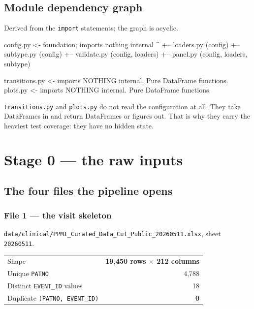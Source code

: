 \documentclass[11pt,a4paper]{article}
\newcommand{\code}[1]{\texttt{\small #1}}
\begin{document}
\subsection{Module dependency graph}

Derived from the \code{import} statements; the graph is acyclic.

\begin{codeblock}
  config.py        <- foundation; imports nothing internal
      ^
      +-- loaders.py      (config)
      +-- subtype.py      (config)
      +-- validate.py     (config, loaders)
      +-- panel.py        (config, loaders, subtype)

  transitions.py   <- imports NOTHING internal. Pure DataFrame functions.
  plots.py         <- imports NOTHING internal. Pure DataFrame functions.
\end{codeblock}

\noindent
\code{transitions.py} and \code{plots.py} do not read the configuration at all.
They take DataFrames in and return DataFrames or figures out. That is why they
carry the heaviest test coverage: they have no hidden state.

\section{Stage 0 --- the raw inputs}

\subsection{The four files the pipeline opens}

\subsubsection*{File 1 --- the visit skeleton}

\code{data/clinical/PPMI\_Curated\_Data\_Cut\_Public\_20260511.xlsx}, sheet
\code{20260511}.

\begin{table}[h]
\centering
\begin{tabular}{@{}lr@{}}
\toprule
Shape & \textbf{19{,}450 rows $\times$ 212 columns} \\
Unique \code{PATNO} & 4{,}788 \\
Distinct \code{EVENT\_ID} values & 18 \\
Duplicate \code{(PATNO, EVENT\_ID)} & \textbf{0} \\
\bottomrule
\end{tabular}
\end{table}
\end{document}
